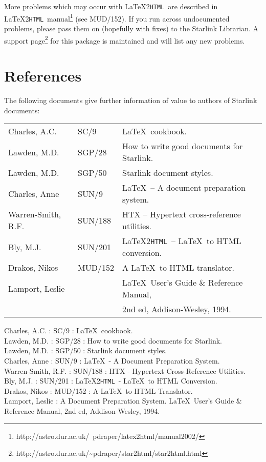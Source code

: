 \documentclass[twoside,11pt]{article}
\newcommand{\htmladdnormallinkfoot}[2]{#1\footnote{#2}}
\newcommand{\htmladdnormallink}[2]{#1}
\newenvironment{latexonly}{}{}
\newcommand{\latex}[1]{#1}
\newcommand{\xref}[3]{#1}
\newcommand{\xlabel}[1]{}
\newcommand{\latextohtml}{\LaTeX2\texttt{HTML}}
\renewcommand{\_}{\texttt{\symbol{95}}}
\newcommand{\LtoHManURL}{http://astro.dur.ac.uk/~{}pdraper/latex2html/manual2002/}
\newcommand{\supportURL}{http://astro.dur.ac.uk/\~{}pdraper/star2html/star2html.html}
\begin{document}
More problems which may occur with \latextohtml\ are described in
\htmladdnormallinkfoot{\latextohtml\ manual}{\LtoHManURL}\latex{ (see
MUD/152)}.  If you run across undocumented problems, please pass them
on (hopefully with fixes) to the
\htmladdnormallink{Starlink Librarian}{mailto:ussc@star.rl.ac.uk}.
A \htmladdnormallinkfoot{support page}{\supportURL} for this
package is maintained and will list any new problems.

\section{\xlabel{references}References}

The following documents give further information of value to authors of
Starlink documents:

\begin{latexonly}
\begin {tabular}{lll}
Charles, A.C. & \xref{SC/9}{sc9}{}
 & \LaTeX\ cookbook.\\
Lawden, M.D. & \xref{SGP/28}{sgp28}{}
 & How to write good documents for Starlink.\\
Lawden, M.D. & \xref{SGP/50}{sgp50}{}
 & Starlink document styles.\\
Charles, Anne & \xref{SUN/9}{sun9}{}
 & \LaTeX\ -- A document preparation system.\\
Warren-Smith, R.F. & \xref{SUN/188}{sun188}{}
 & HTX -- Hypertext cross-reference utilities.\\
Bly, M.J. & \xref{SUN/201}{sun201}{}
 & \latextohtml\ -- \LaTeX\ to HTML conversion.\\
Drakos, Nikos & MUD/152
 & A \LaTeX\ to HTML translator.\\
Lamport, Leslie & & \LaTeX\ User's Guide \& Reference Manual,\\
 & & 2nd ed, Addison-Wesley, 1994.\\
\end {tabular}
\end{latexonly}

\begin{htmlonly}
Charles, A.C. : \xref{SC/9}{sc9}{} :
 \LaTeX\ cookbook.\\
Lawden, M.D. : \xref{SGP/28}{sgp28}{} :
 How to write good documents for Starlink.\\
Lawden, M.D. : \xref{SGP/50}{sgp50}{} :
 Starlink document styles.\\
Charles, Anne : \xref{SUN/9}{sun9}{} :
 \LaTeX\ - A Document Preparation System.\\
Warren-Smith, R.F. : \xref{SUN/188}{sun188}{} :
 HTX - Hypertext Cross-Reference Utilities.\\
Bly, M.J. : \xref{SUN/201}{sun201}{} :
\latextohtml\ - \LaTeX\ to HTML Conversion.\\
Drakos, Nikos : MUD/152 :
 A \LaTeX\ to HTML Translator.\\
Lamport, Leslie : A Document Preparation System.
 \LaTeX\ User's Guide \& Reference Manual, 2nd ed, Addison-Wesley, 1994.
\end{htmlonly}
\end{document}
